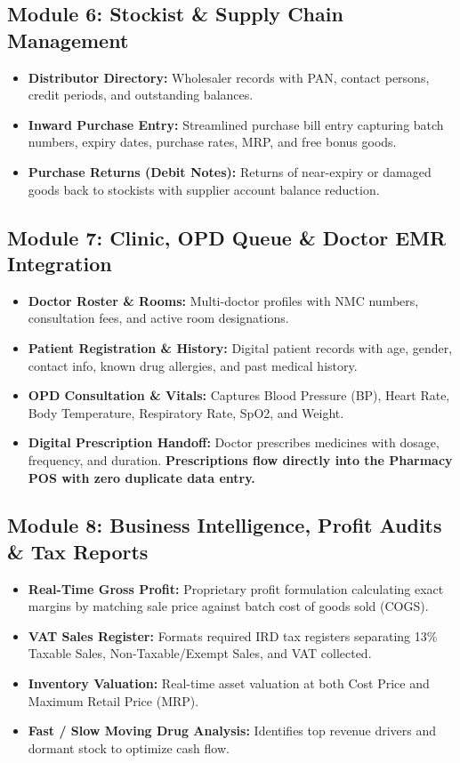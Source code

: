\documentclass[10pt,a4paper]{article}
\begin{document}
\newpage

\subsection{Module 6: Stockist \& Supply Chain Management}
\begin{itemize}
    \item \textbf{Distributor Directory:} Wholesaler records with PAN, contact persons, credit periods, and outstanding balances.
    \item \textbf{Inward Purchase Entry:} Streamlined purchase bill entry capturing batch numbers, expiry dates, purchase rates, MRP, and free bonus goods.
    \item \textbf{Purchase Returns (Debit Notes):} Returns of near-expiry or damaged goods back to stockists with supplier account balance reduction.
\end{itemize}

\subsection{Module 7: Clinic, OPD Queue \& Doctor EMR Integration}
\begin{itemize}
    \item \textbf{Doctor Roster \& Rooms:} Multi-doctor profiles with NMC numbers, consultation fees, and active room designations.
    \item \textbf{Patient Registration \& History:} Digital patient records with age, gender, contact info, known drug allergies, and past medical history.
    \item \textbf{OPD Consultation \& Vitals:} Captures Blood Pressure (BP), Heart Rate, Body Temperature, Respiratory Rate, SpO2, and Weight.
    \item \textbf{Digital Prescription Handoff:} Doctor prescribes medicines with dosage, frequency, and duration. \textbf{Prescriptions flow directly into the Pharmacy POS with zero duplicate data entry.}
\end{itemize}

\subsection{Module 8: Business Intelligence, Profit Audits \& Tax Reports}
\begin{itemize}
    \item \textbf{Real-Time Gross Profit:} Proprietary profit formulation calculating exact margins by matching sale price against batch cost of goods sold (COGS).
    \item \textbf{VAT Sales Register:} Formats required IRD tax registers separating 13\% Taxable Sales, Non-Taxable/Exempt Sales, and VAT collected.
    \item \textbf{Inventory Valuation:} Real-time asset valuation at both Cost Price and Maximum Retail Price (MRP).
    \item \textbf{Fast / Slow Moving Drug Analysis:} Identifies top revenue drivers and dormant stock to optimize cash flow.
\end{itemize}
\end{document}
